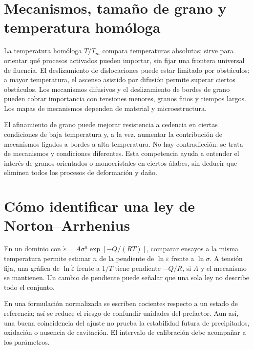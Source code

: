 
\section{Mecanismos, tamaño de grano y temperatura homóloga}
La temperatura homóloga $T/T_m$ compara temperaturas absolutas; sirve para orientar qué procesos activados pueden importar, sin fijar una frontera universal de fluencia. El deslizamiento de dislocaciones puede estar limitado por obstáculos; a mayor temperatura, el ascenso asistido por difusión permite superar ciertos obstáculos. Los mecanismos difusivos y el deslizamiento de bordes de grano pueden cobrar importancia con tensiones menores, granos finos y tiempos largos. Los mapas de mecanismos dependen de material y microestructura.

El afinamiento de grano puede mejorar resistencia a cedencia en ciertas condiciones de baja temperatura y, a la vez, aumentar la contribución de mecanismos ligados a bordes a alta temperatura. No hay contradicción: se trata de mecanismos y condiciones diferentes. Esta competencia ayuda a entender el interés de granos orientados o monocristales en ciertos álabes, sin deducir que eliminen todos los procesos de deformación y daño.
\section{Cómo identificar una ley de Norton--Arrhenius}
En un dominio con $\dot\varepsilon=A\sigma^n\exp[-Q/(RT)]$, comparar ensayos a la misma temperatura permite estimar $n$ de la pendiente de $\ln\dot\varepsilon$ frente a $\ln\sigma$. A tensión fija, una gráfica de $\ln\dot\varepsilon$ frente a $1/T$ tiene pendiente $-Q/R$, si $A$ y el mecanismo se mantienen. Un cambio de pendiente puede señalar que una sola ley no describe todo el conjunto.

En una formulación normalizada se escriben cocientes respecto a un estado de referencia; así se reduce el riesgo de confundir unidades del prefactor. Aun así, una buena coincidencia del ajuste no prueba la estabilidad futura de precipitados, oxidación o ausencia de cavitación. El intervalo de calibración debe acompañar a los parámetros.
\Needspace{.48\textheight}
